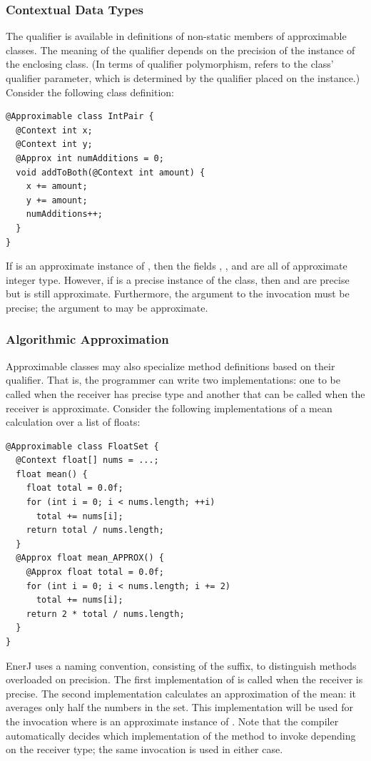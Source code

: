 \subsubsection{Contextual Data Types}
\label{enerj:context}
The  qualifier is available
in definitions of non-static members of approximable classes.
The meaning of
the qualifier depends on the precision of the instance of the
enclosing class. (In terms of qualifier polymorphism, 
refers to the class' qualifier parameter, which is determined by the
qualifier placed on the instance.)
Consider the following class definition:
\begin{lstlisting}
@Approximable class IntPair {
  @Context int x;
  @Context int y;
  @Approx int numAdditions = 0;
  void addToBoth(@Context int amount) {
    x += amount;
    y += amount;
    numAdditions++;
  }
}
\end{lstlisting}
If  is an approximate instance of , then the fields
, , and  are all of approximate
integer type. However, if  is a precise instance of the class, then
 and  are precise but  is still
approximate. Furthermore, the argument to the invocation 
must be precise; the argument to  may be
approximate.

\subsubsection{Algorithmic Approximation}
\label{enerj:overload}
Approximable classes may also specialize method definitions based on their
qualifier.
That is, the programmer can write two implementations:
one to be called when the receiver has
precise type and another that can be called when the receiver is approximate.
Consider the following implementations of a mean calculation over a list of
floats:
\begin{lstlisting}
@Approximable class FloatSet {
  @Context float[] nums = ...;
  float mean() {
    float total = 0.0f;
    for (int i = 0; i < nums.length; ++i)
      total += nums[i];
    return total / nums.length;
  }
  @Approx float mean_APPROX() {
    @Approx float total = 0.0f;
    for (int i = 0; i < nums.length; i += 2)
      total += nums[i];
    return 2 * total / nums.length;
  }
}
\end{lstlisting}
EnerJ uses a naming convention, consisting of the 
suffix, to distinguish methods overloaded on precision. The first
implementation of  is called when the receiver is
precise.
The second implementation calculates an approximation of the mean: it
averages only half the numbers in the set. This implementation will be
used for the invocation  where  is an
approximate instance of .
Note that the compiler automatically decides which implementation of the
method to invoke depending on the receiver type; the same invocation is used in
either case.

